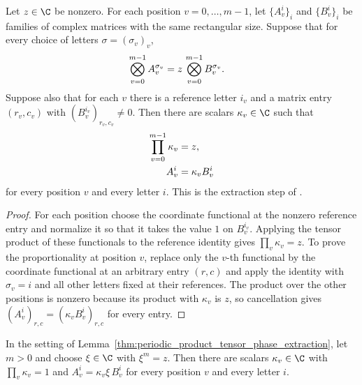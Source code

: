 \begin{lemma}
    \label{thm:periodic_product_tensor_phase_extraction}
    \leanok
    Let $z\in\C$ be nonzero. For each position $v=0,\ldots,m-1$, let
    $\{A_v^i\}_i$ and $\{B_v^i\}_i$ be families of complex matrices with the
    same rectangular size. Suppose that for every choice of letters
    $\sigma=(\sigma_v)_v$,
    \begin{align}
        \bigotimes_{v=0}^{m-1} A_v^{\sigma_v}
         & =
        z\,\bigotimes_{v=0}^{m-1} B_v^{\sigma_v}.
        \notag
    \end{align}
    Suppose also that for each $v$ there is a reference letter $i_v$ and a
    matrix entry $(r_v,c_v)$ with
    $(B_v^{i_v})_{r_v,c_v}\ne 0$. Then there are scalars
    $\kappa_v\in\C$ such that
    \begin{align}
        \prod_{v=0}^{m-1}\kappa_v & =z,
        \notag                                      \\
        A_v^i                     & =\kappa_v B_v^i
        \notag
    \end{align}
    for every position $v$ and every letter $i$. This is the extraction step
    of \cite[Appendix~A, lines~1072--1080]{DeLasCuevas2017Irreducible}.
\end{lemma}

\begin{proof}
    \leanok
    For each position choose the coordinate functional at the nonzero
    reference entry and normalize it so that it takes the value $1$ on
    $B_v^{i_v}$. Applying the tensor product of these functionals to the
    reference identity gives $\prod_v\kappa_v=z$. To prove the
    proportionality at position $v$, replace only the $v$-th functional by the
    coordinate functional at an arbitrary entry $(r,c)$ and apply the
    identity with $\sigma_v=i$ and all other letters fixed at their
    references. The product over the other positions is nonzero because its
    product with $\kappa_v$ is $z$, so cancellation gives
    $(A_v^i)_{r,c}=(\kappa_v B_v^i)_{r,c}$ for every entry.
\end{proof}

\begin{lemma}
    \label{thm:periodic_product_one_phase_extraction}
    \leanok
    In the setting of
    Lemma~\ref{thm:periodic_product_tensor_phase_extraction}, let $m>0$ and
    choose $\xi\in\C$ with $\xi^m=z$. Then there are scalars $\kappa_v\in\C$
    with $\prod_v\kappa_v=1$ and $A_v^i=\kappa_v\xi\,B_v^i$ for every
    position $v$ and every letter $i$.
\end{lemma}

